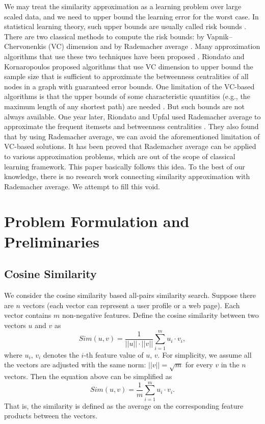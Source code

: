 \documentclass{article}
\begin{document}
We may treat the similarity approximation as a learning problem over large scaled data, and we need to upper bound the learning error for the worst case. In statistical learning theory, such upper bounds are usually called risk bounds \cite{Vap13}. There are two classical methods to compute the risk bounds: by Vapnik–Chervonenkis (VC) dimension \cite{VLL94,Vap98,Vap13} and by Rademacher average \cite{Mohri09,BM02,BBM05}. Many approximation algorithms that use these two techniques have been proposed \cite{RK14,RK16,RU15,RU16}. Riondato and Kornaropoulos \cite{RK14,RK16} proposed algorithms that use VC dimension to upper bound the sample size that is sufficient to approximate the betweenness centralities \cite{Bran01} of all nodes in a graph with guaranteed error bounds. One limitation of the VC-based algorithms is that the upper bounds of some characteristic quantities (e.g., the maximum length of any shortest path) are needed \cite{RK14,RK16,RU16}. But such bounds are not always available. One year later, Riondato and Upfal used Rademacher average to approximate the frequent itemsets \cite{RU15} and betweenness centralities \cite{RU16}. They also found that by using Rademacher average, we can avoid the aforementioned limitation of VC-based solutions. It has been proved that Rademacher average can be applied to various approximation problems, which are out of the scope of classical learning framework. This paper basically follows this idea. To the best of our knowledge, there is no research work connecting similarity approximation with Rademacher average. We attempt to fill this void.

\section{Problem Formulation and Preliminaries}
\subsection{Cosine Similarity}
We consider the cosine similarity based all-pairs similarity search.
Suppose there are $n$ vectors (each vector can represent a user profile or a web page). Each vector contains $m$ non-negative features. Define the cosine similarity between two vectors $u$ and $v$ as
$$Sim(u,v) = \frac{1}{||u||\cdot||v||} \sum_{i=1}^m u_i\cdot v_i,$$
where $u_i$, $v_i$ denotes the $i$-th feature value of $u$, $v$.
For simplicity, we assume all the vectors are adjusted with the same norm: $||v|| = \sqrt{m}$ for every $v$ in the $n$ vectors. Then the equation above can be simplified as
$$Sim(u,v) = \frac{1}{m} \sum_{i=1}^m u_i\cdot v_i.$$
That is, the similarity is defined as the average on the corresponding feature products between the vectors. 
\end{document}
